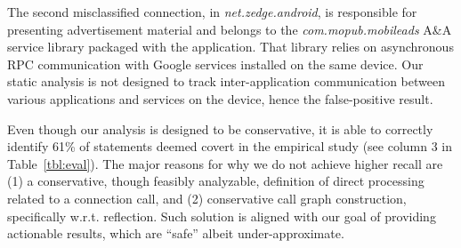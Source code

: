 The second misclassified connection, in \emph{net.zedge.android}, is responsible for presenting advertisement material and belongs to the \emph{com.mopub.mobileads} A\&A service library packaged with the application. 
That library relies on asynchronous RPC communication with Google services 
installed on the same device. Our static analysis is not designed to track inter-application communication between various applications and services on the device, hence the false-positive result.   
 

%

Even though our analysis is designed to be conservative, it is able to correctly identify 
61\% of statements deemed covert in the empirical study (see column 3 in Table~\ref{tbl:eval}). 
The major reasons for why we do
not achieve higher recall are (1) a conservative, though feasibly
analyzable, definition of direct processing related to a connection
call, and (2) conservative call graph construction, specifically
w.r.t. reflection.
Such solution is aligned with our goal of providing actionable results, which are ``safe'' albeit under-approximate.  

